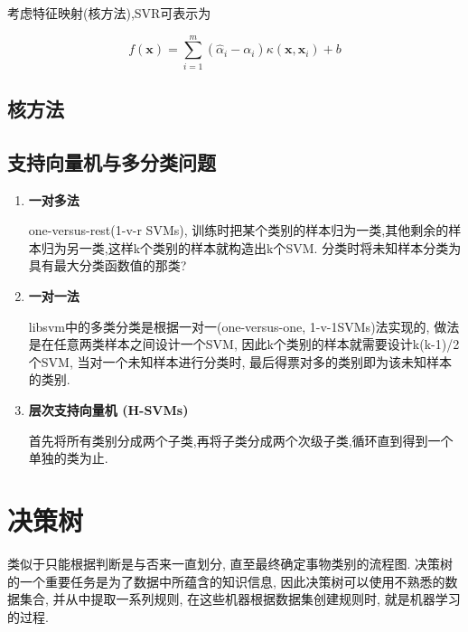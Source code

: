 \documentclass[12pt]{article}
\numberwithin{equation}{section}%
\begin{document}
考虑特征映射(核方法),SVR可表示为

\begin{equation}
f(\boldsymbol{x})=\sum_{i=1}^{m}(\hat{\alpha}_{i}-\alpha_{i})\kappa(\boldsymbol{x},\boldsymbol{x}_{i})+b
\label{•}
\end{equation}

\subsection{核方法}

\subsection{支持向量机与多分类问题}

\begin{enumerate}

\item{\textbf{一对多法}}

one-versus-rest(1-v-r SVMs), 训练时把某个类别的样本归为一类,其他剩余的样本归为另一类,这样k个类别的样本就构造出k个SVM. {\color{blue}分类时将未知样本分类为具有最大分类函数值的那类?}



\item{\textbf{一对一法}}    

libsvm中的多类分类是根据一对一(one-versus-one, 1-v-1SVMs)法实现的, 做法是在任意两类样本之间设计一个SVM, 因此k个类别的样本就需要设计k(k-1)/2个SVM, 当对一个未知样本进行分类时, 最后得票对多的类别即为该未知样本的类别. 

\item{\textbf{层次支持向量机 (H-SVMs)}}

首先将所有类别分成两个子类,再将子类分成两个次级子类,循环直到得到一个单独的类为止. 


\end{enumerate}


\section{决策树}

类似于只能根据判断是与否来一直划分, 直至最终确定事物类别的流程图. 决策树的一个重要任务是为了数据中所蕴含的知识信息, 因此决策树可以使用不熟悉的数据集合, 并从中提取一系列规则, 在这些机器根据数据集创建规则时, 就是机器学习的过程. 
\end{document}
